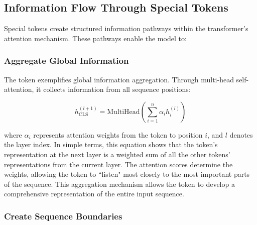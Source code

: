 \subsection{Information Flow Through Special Tokens}

Special tokens create structured information pathways within the transformer's attention mechanism. These pathways enable the model to:

\subsubsection{Aggregate Global Information}

The \cls{} token exemplifies global information aggregation. Through multi-head self-attention, it collects information from all sequence positions:

\begin{equation}
h_{\text{CLS}}^{(l+1)} = \text{MultiHead}\left(\sum_{i=1}^{n} \alpha_{i} h_i^{(l)}\right)
\end{equation}

where $\alpha_i$ represents attention weights from the \cls{} token to position $i$, and $l$ denotes the layer index. In simple terms, this equation shows that the \cls{} token's representation at the next layer is a weighted sum of all the other tokens' representations from the current layer. The attention scores determine the weights, allowing the \cls{} token to ``listen" most closely to the most important parts of the sequence. This aggregation mechanism allows the \cls{} token to develop a comprehensive representation of the entire input sequence.
\begin{comment}
Feedback: The equation is correct, but it might be helpful to add a plain-language explanation of what it means. For example: "In simple terms, this equation shows that the [CLS] token's representation at the next layer is a weighted sum of all the other tokens' representations from the current layer. The attention scores determine the weights, allowing the [CLS] token to 'listen' most closely to the most important parts of the sequence."

STATUS: addressed - added plain-language explanation of the attention equation showing weighted aggregation
\end{comment}

\subsubsection{Create Sequence Boundaries}

